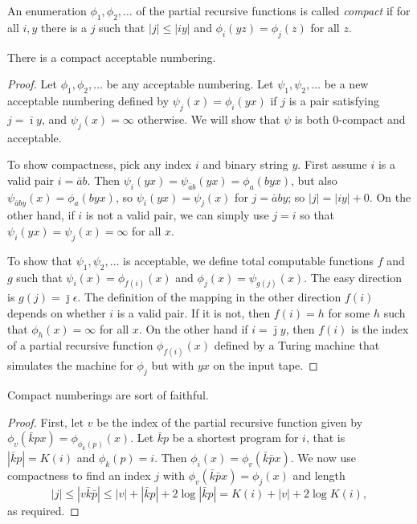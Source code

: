 \documentclass{style/llncs}
\begin{document}
\begin{definition}
  An enumeration $\phi_1,\phi_2,\ldots$ of the partial recursive
  functions is called \emph{compact} if for all $i,y$ there is a $j$
  such that $|j|\le|i y|$ and $\phi_i(y z)=\phi_j(z)$ for all $z$.
\end{definition}

\begin{lemma}
There is a compact acceptable numbering.
\end{lemma}
\begin{proof}
  Let $\phi_1,\phi_2,\ldots$ be any acceptable numbering. Let $\psi_1,\psi_2,\ldots$ be a new acceptable numbering defined by $\psi_j(x)=\phi_i(y x)$ if $j$ is a pair satisfying $j=\bar\imath y$, and $\psi_j(x)=\infty$ otherwise.  We will show that $\psi$ is both $0$-compact and acceptable. 

To show compactness, pick any index $i$ and binary string $y$. First assume $i$ is a valid pair $i=\bar a b$. Then  $\psi_i(y x) = \psi_{\bar a b}(y x)=\phi_a(b y x)$, but also $\psi_{\bar a b y}(x)=\phi_a(b y x)$, so $\psi_i(y x) = \psi_j(x)$ for $j=\bar a b y$; so $|j|=|iy|+0$. On the other hand, if $i$ is not a valid pair, we can simply use $j=i$ so that $\psi_i(y x)=\psi_j(x)=\infty$ for all $x$.

To show that $\psi_1,\psi_2,\ldots$ is acceptable, we define total
computable functions $f$ and $g$ such that $\psi_i(x)=\phi_{f(i)}(x)$
and $\phi_j(x)=\psi_{g(j)}(x)$. The easy direction is
$g(j)=\bar\jmath\epsilon$. The definition of the mapping in the other
direction $f(i)$ depends on whether $i$ is a valid pair. If it is not,
then $f(i)=h$ for some $h$ such that $\phi_h(x)=\infty$ for all $x$. On the other hand if $i=\bar\jmath y$, then $f(i)$ is the index of a partial recursive function $\phi_{f(i)}(x)$ defined by a Turing machine that simulates the machine for $\phi_j$ but with $yx$ on the input tape.
\end{proof}


\begin{lemma}
Compact numberings are sort of faithful.
\end{lemma}
\begin{proof}
First, let $v$ be the index of the partial recursive function given by $\phi_v(\bar k p x)=\phi_{\phi_k(p)}(x)$. Let $\bar k p$ be a shortest program for $i$, that is $|\bar k p| = K(i)$ and $\phi_k(p)=i$. Then $\phi_i(x)=\phi_v(\bar k \bar p x)$. We now use compactness to find an index $j$ with $\phi_v(\bar k \bar p x)=\phi_j(x)$ and length
\[|j|\le |v\bar k\bar p|\le|v|+|\bar k p|+2\log|\bar k p|=K(i)+|v|+2\log K(i),\]
as required.
\end{proof}
\end{document}
